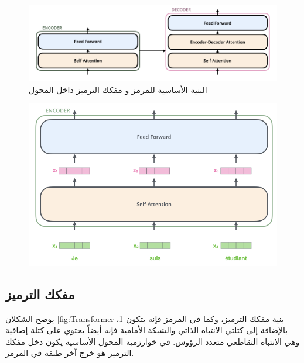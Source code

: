 \begin{figure}[h!]
	\centerline{\includegraphics[scale=0.3]{images/encoder_decoder_illustrated_transformer}}
	\caption{البنية الأساسية للمرمز و مفكك الترميز
		داخل المحول
		}
	\label{fig:enc_dec}
\end{figure}

\begin{figure}[h!]
	\centerline{\includegraphics[scale=0.3]{images/position_wise_illustrated_transformer}}
	\caption{
	}
	\label{fig:positionWise}
\end{figure}
 
\subsection{مفكك الترميز}
يوضح الشكلان
\ref{fig:Transformer}،\ref{fig:enc_dec}
بنية مفكك الترميز،
وكما في المرمز فإنه يتكون بالإضافة إلى كتلتي الانتباه الذاتي والشبكة الأمامية فإنه أيضاً يحتوي على كتلة إضافية وهي الانتباه التقاطعي متعدد الرؤوس.
في خوارزمية المحول الأساسية
يكون دخل مفكك الترميز  هو خرج آخر طبقة في المرمز.
